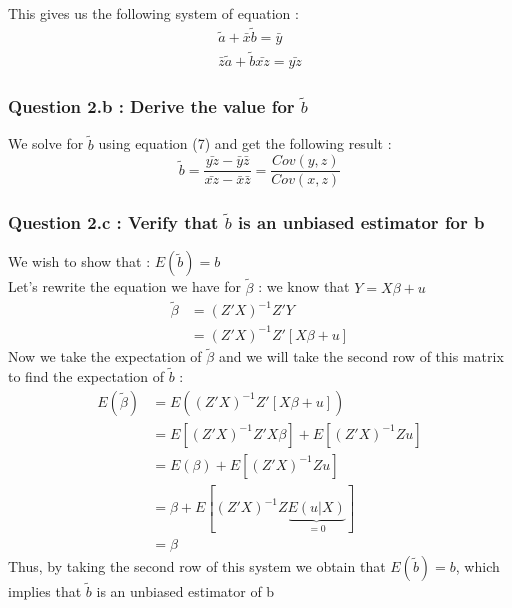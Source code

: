 \documentclass{article}
\begin{document}


This gives us the following system of equation : 
\begin{equation}
\begin{aligned}
    \tilde{a} + \bar{x}\tilde{b}  = \bar{y} \\
    \bar{z}\tilde{a}+\tilde{b}\bar{xz} = \bar{yz}
\end{aligned}
\end{equation}

\subsubsection{Question 2.b : Derive the value for $\tilde{b}$}
We solve for $\tilde{b}$ using equation (7) and get the following result : 
\begin{equation}
    \tilde{b}=\frac{\bar{yz}-\bar{y}\bar{z}}{\bar{xz}-\bar{x}\bar{z}} = \frac{Cov(y,z)}{Cov(x,z)}
\end{equation}

\subsubsection{Question 2.c : Verify that $\tilde{b}$ is an unbiased estimator for b}
We wish to show that : $E(\tilde{b}) = b$\\
Let's rewrite the equation we have for $\tilde{\beta}$ : we know that $Y = X\beta + u$
\begin{equation}
\begin{aligned}
    \tilde{\beta} &= (Z'X)^{-1}Z'Y\\
    &= (Z'X)^{-1}Z'[X\beta+u]
\end{aligned}
\end{equation}
Now we take the expectation of $\tilde{\beta}$ and we will take the second row of this matrix to find the expectation of $\tilde{b}$ : 
\begin{equation}
\begin{aligned}
    E(\tilde{\beta}) &= E((Z'X)^{-1}Z'[X\beta+u])\\
    &= E[(Z'X)^{-1}Z'X\beta] + E[(Z'X)^{-1}Zu] \\
    &= E(\beta) + E[(Z'X)^{-1}Zu]\\
    &= \beta + E[(Z'X)^{-1}Z\underbrace{E(u|X)}_{=0}]\\
    &= \beta
\end{aligned}
\end{equation}
Thus, by taking the second row of this system we obtain that $E(\tilde{b}) = b$, which implies that $\tilde{b}$ is an unbiased estimator of b
\end{document}
